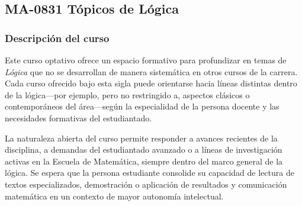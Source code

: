 \newpage
\subsection*{MA-0831 Tópicos de Lógica}

\hypertarget{MA0831}{}
\begin{refsection}
\begin{table}[H]
\end{table}

\subsubsection*{Descripción del curso}

Este curso optativo ofrece un espacio formativo para profundizar en temas de \emph{Lógica} que no se desarrollan de manera sistemática en otros cursos de la carrera. Cada curso ofrecido bajo esta sigla puede orientarse hacia líneas distintas dentro de la lógica---por ejemplo, pero no restringido a, aspectos clásicos o contemporáneos del área---según la especialidad de la persona docente y las necesidades formativas del estudiantado.

La naturaleza abierta del curso permite responder a avances recientes de la disciplina, a demandas del estudiantado avanzado o a líneas de investigación activas en la Escuela de Matemática, siempre dentro del marco general de la lógica. Se espera que la persona estudiante consolide su capacidad de lectura de textos especializados, demostración o aplicación de resultados y comunicación matemática en un contexto de mayor autonomía intelectual.


\end{refsection}
